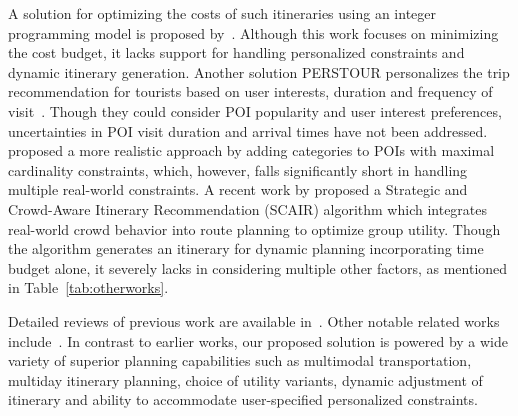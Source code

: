 A solution for optimizing the costs of such itineraries using an integer programming model is proposed by~\citep{rambha2024optimized}. Although this work focuses on minimizing the cost budget, it lacks support for handling personalized constraints and dynamic itinerary generation. Another solution PERSTOUR personalizes the trip recommendation for tourists based on user interests, duration and frequency of visit~\citep{lim2018personalized}. Though they could consider POI popularity and user interest preferences, uncertainties in POI visit duration and arrival times have not been addressed. \citet{bolzoni2014efficient} proposed a more realistic approach by adding categories to POIs with maximal cardinality constraints, which, however, falls significantly short in handling multiple real-world constraints. A recent work by \citep{liu2025optimizing} proposed a Strategic and Crowd-Aware Itinerary Recommendation
(SCAIR) algorithm which integrates real-world crowd behavior into route planning to optimize group utility. Though the algorithm generates an itinerary for dynamic planning incorporating time budget alone, it severely lacks in considering multiple other factors, as mentioned in Table~\ref{tab:otherworks}. 

Detailed reviews of previous work are available in~\citep{gavalas2014survey, sylejmani2011survey}.
Other notable related works include~\citep{zheng2021novel,yu2017mining,jiaoman2018travel,sylejmani2017planning,zografos2008algorithms,rani2018development,yu2014optimal,arora2024itinerary}. In contrast to earlier works, our proposed \trip solution is powered by a wide variety of superior planning capabilities such as multimodal transportation, multiday itinerary planning, choice of utility variants, dynamic adjustment of itinerary and ability to accommodate user-specified personalized constraints.

